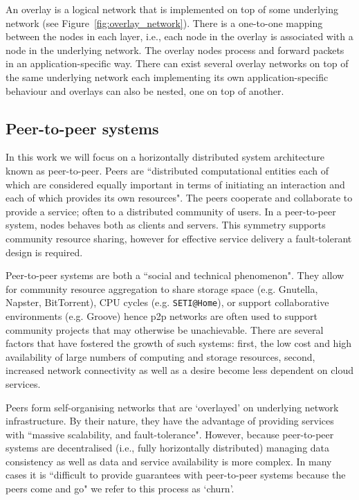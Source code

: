An overlay is a logical network that is implemented on top of some underlying network (see Figure~\ref{fig:overlay_network}). There is a one-to-one mapping between the nodes in each layer, i.e., each node in the overlay is associated with a node in the underlying network. The overlay nodes process and forward packets in an application-specific way. There can exist several overlay networks on top of the same underlying network each implementing its own application-specific behaviour and overlays can also be nested, one on top of another.\cite{peterson2012networks}

\subsection{Peer-to-peer systems}
\label{subsec:p2pSystems}

In this work we will focus on a horizontally distributed system architecture known as peer-to-peer. Peers are ``distributed computational entities each of which are considered equally important in terms of initiating an interaction and each of which provides its own resources"\cite{bass2003architecture}. The peers cooperate and collaborate to provide a service; often to a distributed community of users. In a peer-to-peer system, nodes behaves both as clients and servers. This symmetry supports community resource sharing, however for effective service delivery a fault-tolerant design is required\cite{lua2005survey}.

Peer-to-peer systems are both a ``social and technical phenomenon"\cite{ripeanu2001peer}. They allow for community resource aggregation to share storage space (e.g. Gnutella, Napster, BitTorrent), CPU cycles (e.g. \verb+SETI@Home+), or support collaborative environments (e.g. Groove) hence p2p networks are often used to support community projects that may otherwise be unachievable. There are several factors that have fostered the growth of such systems: first, the low cost and high availability of large numbers of computing and storage resources, second, increased network connectivity\cite{ripeanu2001peer} as well as a desire become less dependent on cloud services\cite{raval2016decentralised}.

Peers form self-organising networks that are `overlayed' on underlying network infrastructure. By their nature, they have the advantage of providing services with ``massive scalability, and fault-tolerance"\cite{lua2005survey}. However, because peer-to-peer systems are decentralised (i.e., fully horizontally distributed) managing data consistency as well as data and service availability is more complex. In many cases it is ``difficult to provide guarantees with peer-to-peer systems because the peers come and go"\cite{bass2003architecture} we refer to this process as `churn'\cite{baldoni2005churn}.

